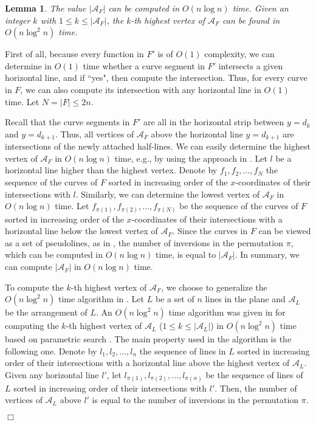 \documentclass[11pt]{article}
\newenvironment{proof}{\noindent {\textbf{Proof:}}\rm}{\hfill $\Box$
\rm}
\def\calA{\mathcal{A}}
\newtheorem{Lem}{Lemma}
\begin{document}
\begin{Lem}\label{lem:new50}
The value $|\calA_F|$ can be computed in $O(n\log n)$ time. Given an
integer $k$ with $1\leq k\leq |\calA_F|$, the $k$-th
highest vertex of $\calA_F$ can be found in $O(n\log^2 n)$ time.
\end{Lem}
\begin{proof}
First of all, because every function in $F'$ is of $O(1)$ complexity,
we can determine in $O(1)$ time whether a curve segment in $F'$
intersects a given horizontal line, and if ``yes", then compute the
intersection. Thus, for every curve in $F$, we can also compute its
intersection with any horizontal line in $O(1)$ time. Let
$N=|F|\leq 2n$.

Recall that the curve segments in $F'$ are all in the horizontal strip between
$y=d_k$ and $y=d_{k+1}$. Thus, all vertices of $\calA_F$ above the
horizontal line $y=d_{k+1}$ are intersections of the newly attached half-lines.
We can easily determine the highest vertex of $\calA_F$ in
$O(n\log n)$ time, e.g., by using the approach in \cite{ref:ColeAn89}. Let
$l$ be a horizontal line higher than the highest vertex. Denote by
$f_1,f_2,\ldots,f_N$ the sequence of the curves of $F$ sorted in
increasing order of the $x$-coordinates of their intersections with
$l$. Similarly, we can determine the lowest vertex of $\calA_F$ in
$O(n\log n)$ time. Let $f_{\pi(1)},f_{\pi(2)},\ldots,f_{\pi(N)}$ be
the sequence of the curves of $F$ sorted in increasing order of the
$x$-coordinates of their intersections with a horizontal line below
the lowest vertex of $\calA_F$. Since the curves in $F$ can be
viewed as a set of pseudolines, as in \cite{ref:ColeAn89}, the
number of inversions in the permutation $\pi$, which can be computed
in $O(n\log n)$ time, is equal to $|\calA_F|$. In summary, we can
compute $|\calA_F|$ in $O(n\log n)$ time.

To compute the $k$-th highest vertex of $\calA_F$, we choose to
generalize the $O(n\log^2 n)$ time algorithm in \cite{ref:ColeAn89}.
Let $L$ be a set of $n$ lines in the plane and $\calA_L$ be the arrangement of $L$.
An $O(n\log^2 n)$ time algorithm was given in \cite{ref:ColeAn89} for
computing the $k$-th highest vertex of $\calA_L$ ($1\leq k\leq |\calA_L|$)
in $O(n\log^2 n)$ time based on parametric search \cite{ref:ColeSl87,ref:MegiddoAp83}. The main
property used in the algorithm \cite{ref:ColeAn89} is the following one. Denote by
$l_1,l_2,\ldots,l_n$ the sequence of lines in $L$ sorted in
increasing order of their intersections with a horizontal line above
the highest vertex of $\calA_L$. Given any horizontal line $l'$, let
$l_{\pi(1)},l_{\pi(2)},\ldots,l_{\pi(n)}$ be the sequence of lines
of $L$ sorted in increasing order of their intersections with $l'$.
Then, the number of vertices of $\calA_L$ above $l'$ is equal to the
number of inversions in the permutation $\pi$.


\end{proof}
\end{document}
